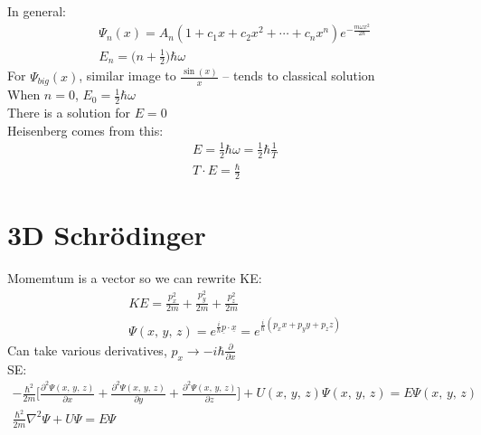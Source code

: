 \documentclass[a4paper, 11pt, fleqn, normalem]{report}
\begin{document}
In general:
\begin{gather*}
    \Psi_{n}(x) = A_{n}(1 + c_{1}x + c_{2}x^{2} + \cdots + c_{n}x^{n})e^{-\tfrac{m\omega x^{2}}{2\hbar}} \\
    E_{n} = \bigg(n + \frac{1}{2}\bigg)\hbar\omega
\end{gather*}
For $\Psi_{big}(x)$, similar image to $\frac{\sin(x)}{x}$ -- tends to classical solution \\
When $n = 0$, $E_{0} = \frac{1}{2}\hbar\omega$ \\
There is a solution for $E = 0$ \\
Heisenberg comes from this:
\begin{gather*}
    E = \frac{1}{2}\hbar\omega = \frac{1}{2}\hbar\frac{1}{T} \\
    T\cdot E = \frac{\hbar}{2}
\end{gather*}

\section{3D Schr\"{o}dinger}
Momemtum is a vector so we can rewrite KE:
\begin{gather*}
    KE = \frac{p_{x}^{2}}{2m} + \frac{p_{y}^{2}}{2m} + \frac{p_{z}^{2}}{2m} \\
    \Psi(x,\,y,\,z) = e^{\tfrac{i}{\hbar}\underline{p}\cdot\underline{x}} = e^{\tfrac{i}{\hbar}(p_{x}x + p_{y}y + p_{z}z)}
\end{gather*}
Can take various derivatives, $p_{x} \rightarrow -i\hbar\frac{\partial}{\partial x}$ \\
SE:
\begin{gather*}
    -\frac{\hbar^{2}}{2m}\Bigg[\frac{\partial^{2}\Psi(x,\,y,\,z)}{\partial x} + \frac{\partial^{2}\Psi(x,\,y,\,z)}{\partial y} + \frac{\partial^{2}\Psi(x,\,y,\,z)}{\partial z}\Bigg] + U(x,\,y,\,z)\Psi(x,\,y,\,z) = E\Psi(x,\,y,\,z) \\
    \frac{\hbar^{2}}{2m}\nabla^{2}\Psi + U\Psi = E\Psi
\end{gather*}
\end{document}
